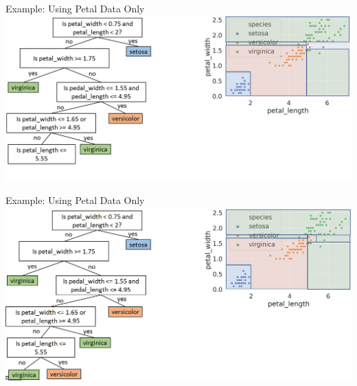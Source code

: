 \documentclass[aspectratio=169]{../latex_main/tntbeamer}  %
\begin{document}
	
	\begin{frame}{Example: Using Petal Data Only}
	        \includegraphics[scale=.34]{figure_tree/Bild14}
	\end{frame}
	
	
	\begin{frame}{Example: Using Petal Data Only}
	        \includegraphics[scale=.34]{figure_tree/Bild15}
	\end{frame}
	
\end{document}
